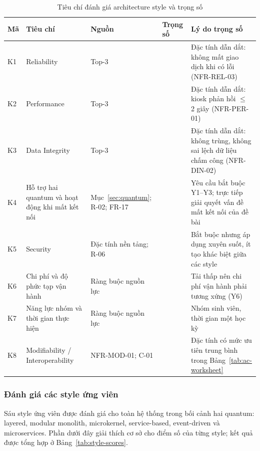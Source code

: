 \begin{table}[H]
\centering
\caption{Tiêu chí đánh giá architecture style và trọng số}\label{tab:style-criteria}
\small
\renewcommand{\arraystretch}{1.3}
\begin{tabularx}{\textwidth}{|>{\centering\arraybackslash}p{0.8cm}|>{\raggedright\arraybackslash}p{3.6cm}|>{\raggedright\arraybackslash}p{2.8cm}|>{\centering\arraybackslash}p{1.4cm}|>{\raggedright\arraybackslash}X|}
\hline
\textbf{Mã} & \textbf{Tiêu chí} & \textbf{Nguồn} & \textbf{Trọng số} & \textbf{Lý do trọng số} \\
\hline
K1 & Reliability & Top-3 & 3 & Đặc tính dẫn dắt: không mất giao dịch khi có lỗi (NFR-REL-03) \\
\hline
K2 & Performance & Top-3 & 3 & Đặc tính dẫn dắt: kiosk phản hồi $\le$ 2 giây (NFR-PER-01) \\
\hline
K3 & Data Integrity & Top-3 & 3 & Đặc tính dẫn dắt: không trùng, không sai lệch dữ liệu chấm công (NFR-DIN-02) \\
\hline
K4 & Hỗ trợ hai quantum và hoạt động khi mất kết nối & Mục~\ref{sec:quantum}; R-02; FR-17 & 3 & Yêu cầu bắt buộc Y1--Y3; trực tiếp giải quyết vấn đề mất kết nối của đề bài \\
\hline
K5 & Security & Đặc tính nền tảng; R-06 & 2 & Bắt buộc nhưng áp dụng xuyên suốt, ít tạo khác biệt giữa các style \\
\hline
K6 & Chi phí và độ phức tạp vận hành & Ràng buộc nguồn lực & 2 & Tải thấp nên chi phí vận hành phải tương xứng (Y6) \\
\hline
K7 & Năng lực nhóm và thời gian thực hiện & Ràng buộc nguồn lực & 2 & Nhóm sinh viên, thời gian một học kỳ \\
\hline
K8 & Modifiability / Interoperability & NFR-MOD-01; C-01 & 1 & Đặc tính có mức ưu tiên trung bình trong Bảng~\ref{tab:ac-worksheet} \\
\hline
\end{tabularx}
\end{table}

\subsubsection{Đánh giá các style ứng viên}\label{sec:style-evaluation}
Sáu style ứng viên được đánh giá cho toàn hệ thống trong bối cảnh hai quantum: layered, modular monolith, microkernel, service-based, event-driven và microservices. Phần dưới đây giải thích cơ sở cho điểm số của từng style; kết quả được tổng hợp ở Bảng~\ref{tab:style-scores}.

